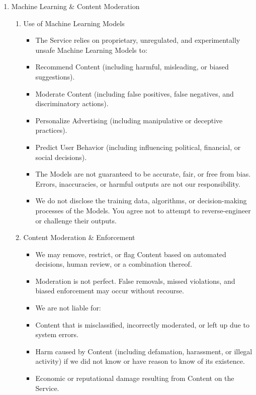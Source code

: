 \documentclass{standalone}
\begin{document}
\begin{enumerate}[label=\arabic*., noitemsep,leftmargin=*]
\begin{enumerate}[label*=\arabic*., noitemsep,leftmargin=*]
\begin{itemize}[noitemsep,leftmargin=*]
			\end{itemize}
		\end{enumerate}
		\item Machine Learning \& Content Moderation
		\begin{enumerate}[label*=\arabic*., noitemsep,leftmargin=*]
			\item Use of Machine Learning Models
			\begin{itemize}[noitemsep,leftmargin=*]
				\item [-] The Service relies on proprietary, unregulated, and experimentally unsafe Machine Learning Models to:
				\item [-] Recommend Content (including harmful, misleading, or biased suggestions).
				\item [-] Moderate Content (including false positives, false negatives, and discriminatory actions).
				\item [-] Personalize Advertising (including manipulative or deceptive practices).
				\item [-] Predict User Behavior (including influencing political, financial, or social decisions).
				\item [-] The Models are not guaranteed to be accurate, fair, or free from bias. Errors, inaccuracies, or harmful outputs are not our responsibility.
				\item [-] We do not disclose the training data, algorithms, or decision-making processes of the Models. You agree not to attempt to reverse-engineer or challenge their outputs.
			\end{itemize}
			\item Content Moderation \& Enforcement
			\begin{itemize}[noitemsep,leftmargin=*]
				\item [-] We may remove, restrict, or flag Content based on automated decisions, human review, or a combination thereof.
				\item [-] Moderation is not perfect. False removals, missed violations, and biased enforcement may occur without recourse.
				\item [-] We are not liable for:
				\item [-] Content that is misclassified, incorrectly moderated, or left up due to system errors.
				\item [-] Harm caused by Content (including defamation, harassment, or illegal activity) if we did not know or have reason to know of its existence.
				\item [-] Economic or reputational damage resulting from Content on the Service.
			\end{itemize}
		\end{enumerate}
		

\end{enumerate}
\end{document}
